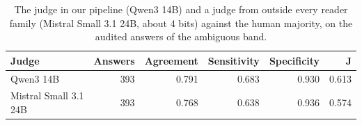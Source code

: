 \begin{table}[t]
\centering\small
\setlength{\tabcolsep}{4pt}
\caption{The judge in our pipeline (Qwen3 14B) and a judge from outside every reader family (Mistral Small 3.1 24B, about 4 bits) against the human majority, on the audited answers of the ambiguous band.}
\label{tab:extra_judges}
\begin{tabular*}{\linewidth}{@{\extracolsep{\fill}}lrrrrr}
\toprule
Judge & Answers & Agreement & Sensitivity & Specificity & J \\
\midrule
Qwen3 14B & 393 & 0.791 & 0.683 & 0.930 & 0.613 \\
Mistral Small 3.1 24B & 393 & 0.768 & 0.638 & 0.936 & 0.574 \\
\bottomrule
\end{tabular*}
\end{table}
